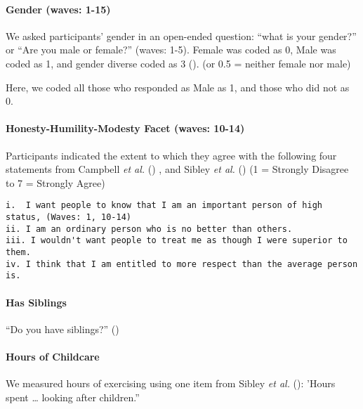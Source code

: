\documentclass[
  single column]{article}
\let\oldparagraph\paragraph
\renewcommand{\paragraph}[1]{\oldparagraph{#1}\mbox{}}
\begin{document}
\paragraph{Gender (waves: 1-15)}\label{gender-waves-1-15}

We asked participants' gender in an open-ended question: ``what is your
gender?'' or ``Are you male or female?'' (waves: 1-5). Female was coded
as 0, Male was coded as 1, and gender diverse coded as 3
(). (or 0.5
= neither female nor male)

Here, we coded all those who responded as Male as 1, and those who did
not as 0.

\paragraph{Honesty-Humility-Modesty Facet (waves:
10-14)}\label{honesty-humility-modesty-facet-waves-10-14}

Participants indicated the extent to which they agree with the following
four statements from Campbell \emph{et al.}
() , and Sibley \emph{et al.}
() (1 = Strongly Disagree to 7 = Strongly
Agree)

\begin{verbatim}
i.  I want people to know that I am an important person of high status, (Waves: 1, 10-14)
ii. I am an ordinary person who is no better than others.
iii. I wouldn't want people to treat me as though I were superior to them.
iv. I think that I am entitled to more respect than the average person is.
\end{verbatim}

\paragraph{Has Siblings}\label{has-siblings}

``Do you have siblings?'' ()

\paragraph{Hours of Childcare}\label{hours-of-childcare}

We measured hours of exercising using one item from Sibley \emph{et al.}
(): 'Hours spent \ldots{} looking after
children.''
\end{document}
